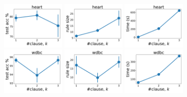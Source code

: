 \begin{figure}[t]
	\centering
	
	\subfloat
	{\includegraphics[width=0.27\textwidth]{figures/interpretability/relaxed-cnf/heart_test_accuracy_vary_clause.pdf}}
	\subfloat
	{\includegraphics[width=0.27\textwidth]{figures/interpretability/relaxed-cnf/heart_rule_size_vary_clause.pdf}}
	\subfloat
	{\includegraphics[width=0.27\textwidth]{figures/interpretability/relaxed-cnf/heart_time_vary_clause.pdf}} 
	\\
	
	\subfloat
	{\includegraphics[width=0.27\textwidth]{figures/interpretability/relaxed-cnf/wdbc_test_accuracy_vary_clause.pdf}}
	\subfloat
	{\includegraphics[width=0.27\textwidth]{figures/interpretability/relaxed-cnf/wdbc_rule_size_vary_clause.pdf}}
	\subfloat
	{\includegraphics[width=0.27\textwidth]{figures/interpretability/relaxed-cnf/wdbc_time_vary_clause.pdf}} 
	\\
	

\end{figure}
